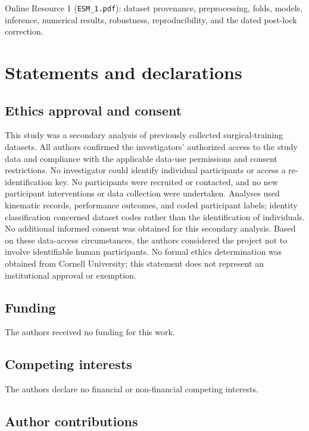 \documentclass[11pt]{article}
\begin{document}
Online Resource 1 (\texttt{ESM\_1.pdf}): dataset provenance,
preprocessing, folds, models, inference, numerical results, robustness,
reproducibility, and the dated post-lock correction.

\section{Statements and declarations}\label{statements-and-declarations}

\subsection{Ethics approval and
consent}\label{ethics-approval-and-consent}

This study was a secondary analysis of previously collected
surgical-training datasets. All authors confirmed the investigators'
authorized access to the study data and compliance with the applicable
data-use permissions and consent restrictions. No investigator could
identify individual participants or access a re-identification key. No
participants were recruited or contacted, and no new participant
interventions or data collection were undertaken. Analyses used
kinematic records, performance outcomes, and coded participant labels;
identity classification concerned dataset codes rather than the
identification of individuals. No additional informed consent was
obtained for this secondary analysis. Based on these data-access
circumstances, the authors considered the project not to involve
identifiable human participants. No formal ethics determination was
obtained from Cornell University; this statement does not represent an
institutional approval or exemption.

\subsection{Funding}\label{funding}

The authors received no funding for this work.

\subsection{Competing interests}\label{competing-interests}

The authors declare no financial or non-financial competing interests.

\subsection{Author contributions}\label{author-contributions}
\end{document}
